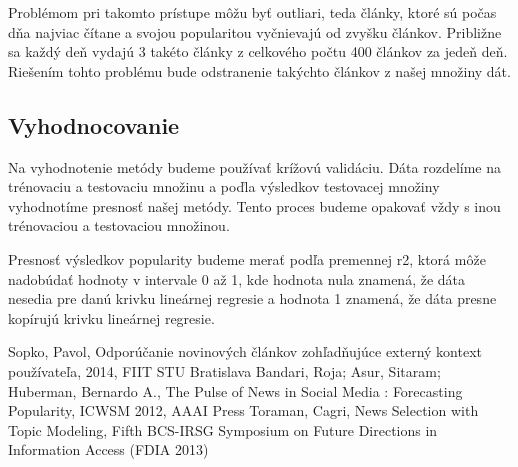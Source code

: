 \documentclass[runningheads,a4paper]{llncs}
\begin{document}
Problémom pri takomto prístupe môžu byť outliari, teda články, ktoré sú počas dňa najviac čítane a svojou popularitou vyčnievajú od zvyšku článkov. Približne sa každý deň vydajú 3 takéto články z celkového počtu 400 článkov za jedeň deň. Riešením tohto problému bude odstranenie takýchto článkov z našej množiny dát.  

\subsection{Vyhodnocovanie}
Na vyhodnotenie metódy budeme používať krížovú validáciu. Dáta rozdelíme na trénovaciu a testovaciu množinu a poďla výsledkov testovacej množiny vyhodnotíme presnosť našej metódy. Tento proces budeme opakovať vždy s inou trénovaciou a testovaciou množinou. 

Presnosť výsledkov popularity budeme merať podľa premennej r2, ktorá môže nadobúdať hodnoty v intervale 0 až 1, kde hodnota nula znamená, že dáta nesedia pre danú krivku lineárnej regresie a hodnota 1 znamená, že dáta presne kopírujú krivku lineárnej regresie.

\begin{thebibliography}{7}
 Sopko, Pavol, Odporúčanie novinových článkov zohľadňujúce externý kontext používateľa, 2014, FIIT STU Bratislava
   Bandari, Roja; Asur, Sitaram; Huberman, Bernardo A., The Pulse of News in Social Media : Forecasting Popularity, ICWSM 2012, AAAI Press
   Toraman, Cagri, News Selection with Topic Modeling, Fifth BCS-IRSG Symposium on Future Directions in Information Access (FDIA 2013)
\end{thebibliography}
\end{document}
